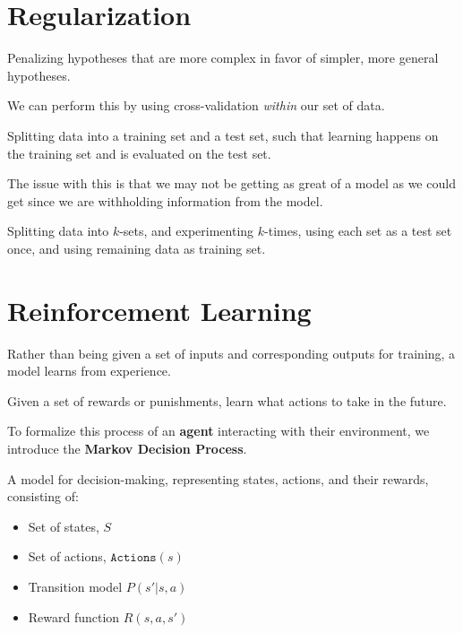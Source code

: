 \section{Regularization}
\begin{definition}[Regularization]
	Penalizing hypotheses that are more complex in favor of simpler, more general hypotheses.
\end{definition}

We can perform this by using cross-validation \emph{within} our set of data.

\begin{definition}
	Splitting data into a training set and a test set, such that learning happens on the training set and is evaluated on the test set.
\end{definition}

The issue with this is that we may not be getting as great of a model as we could get since we are withholding information from the model.

\begin{definition}
	Splitting data into \(k\)-sets, and experimenting \(k\)-times, using each set as a test set once, and using remaining data as training set.
\end{definition}

\section{Reinforcement Learning}
Rather than being given a set of inputs and corresponding outputs for training, a model learns from experience.
\begin{definition}
	Given a set of rewards or punishments, learn what actions to take in the future.
\end{definition}

To formalize this process of an \textbf{agent} interacting with their environment, we introduce the \textbf{Markov Decision Process}.

\begin{definition}
	A model for decision-making, representing states, actions, and their rewards, consisting of:
	\begin{itemize}
		\item Set of states, \(S\) 
		\item Set of actions, \(\texttt{Actions}(s)\) 
		\item Transition model \(P(s' | s, a)\) 
		\item Reward function \(R(s, a, s')\) 
	\end{itemize}
\end{definition}

